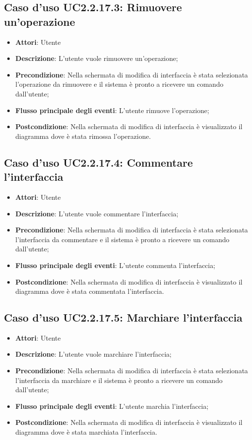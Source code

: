 \documentclass[../AnalisiDeiRequisiti.tex]{subfiles}
\begin{document}
				\subsection{Caso d'uso UC2.2.17.3: Rimuovere un'operazione}
				\begin{itemize}
					\item \textbf{Attori}: Utente
					\item \textbf{Descrizione}: L'utente vuole rimuovere un'operazione;
					\item \textbf{Precondizione}: Nella schermata di modifica di interfaccia è stata selezionata l'operazione da rimuovere e il sistema è pronto a ricevere un comando dall'utente;
					\item \textbf{Flusso principale degli eventi}: L'utente rimuove l'operazione;
					\item \textbf{Postcondizione}: Nella schermata di modifica di interfaccia è visualizzato il diagramma dove è stata rimossa l'operazione.
				\end{itemize}
				\subsection{Caso d'uso UC2.2.17.4: Commentare l'interfaccia}
				\begin{itemize}
					\item \textbf{Attori}: Utente
					\item \textbf{Descrizione}: L'utente vuole commentare l'interfaccia;
					\item \textbf{Precondizione}: Nella schermata di modifica di interfaccia è stata selezionata l'interfaccia da commentare e il sistema è pronto a ricevere un comando dall'utente;
					\item \textbf{Flusso principale degli eventi}: L'utente commenta l'interfaccia;
					\item \textbf{Postcondizione}: Nella schermata di modifica di interfaccia è visualizzato il diagramma dove è stata commentata l'interfaccia.
				\end{itemize}
				\subsection{Caso d'uso UC2.2.17.5: Marchiare l'interfaccia}
				\begin{itemize}
					\item \textbf{Attori}: Utente
					\item \textbf{Descrizione}: L'utente vuole marchiare l'interfaccia;
					\item \textbf{Precondizione}: Nella schermata di modifica di interfaccia è stata selezionata l'interfaccia da marchiare e il sistema è pronto a ricevere un comando dall'utente;
					\item \textbf{Flusso principale degli eventi}: L'utente marchia l'interfaccia;
					\item \textbf{Postcondizione}: Nella schermata di modifica di interfaccia è visualizzato il diagramma dove è stata marchiata l'interfaccia.
				\end{itemize}
\end{document}
